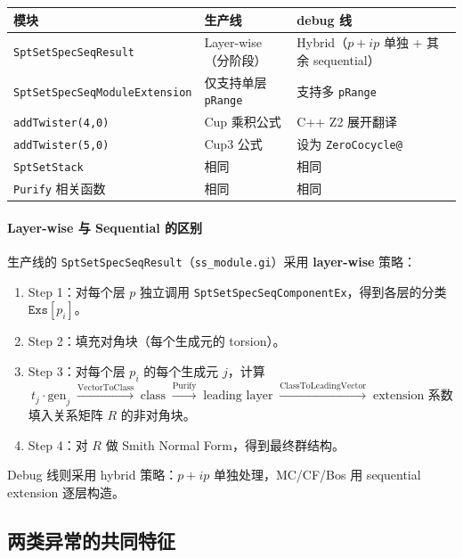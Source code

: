 \documentclass[a4paper,fontset=ubuntu,12pt]{ctexart}
\begin{document}
\begin{center}
\begin{tabular}{lll}
\hline
模块 & 生产线 & debug 线 \\
\hline
\texttt{SptSetSpecSeqResult} & Layer-wise（分阶段） & Hybrid（$p{+}ip$ 单独 + 其余 sequential） \\
\texttt{SptSetSpecSeqModuleExtension} & 仅支持单层 \texttt{pRange} & 支持多 \texttt{pRange} \\
\texttt{addTwister(4,0)} & Cup 乘积公式 & C++ Z2 展开翻译 \\
\texttt{addTwister(5,0)} & Cup3 公式 & 设为 \texttt{ZeroCocycle@} \\
\texttt{SptSetStack} & 相同 & 相同 \\
\texttt{Purify} 相关函数 & 相同 & 相同 \\
\hline
\end{tabular}
\end{center}

\paragraph{Layer-wise 与 Sequential 的区别}

生产线的 \texttt{SptSetSpecSeqResult}（\texttt{ss\_module.gi}）采用 \textbf{layer-wise} 策略：
\begin{enumerate}
\item Step 1：对每个层 $p$ 独立调用 \texttt{SptSetSpecSeqComponentEx}，得到各层的分类 $\texttt{Exs}[p_i]$。
\item Step 2：填充对角块（每个生成元的 torsion）。
\item Step 3：对每个层 $p_i$ 的每个生成元 $j$，计算
\begin{equation}
t_j \cdot \text{gen}_j \;\xrightarrow{\text{VectorToClass}}\; \text{class} \;\xrightarrow{\text{Purify}}\; \text{leading layer} \;\xrightarrow{\text{ClassToLeadingVector}}\; \text{extension 系数}
\end{equation}
填入关系矩阵 $R$ 的非对角块。
\item Step 4：对 $R$ 做 Smith Normal Form，得到最终群结构。
\end{enumerate}

Debug 线则采用 hybrid 策略：$p{+}ip$ 单独处理，MC/CF/Bos 用 sequential extension 逐层构造。

\subsection{两类异常的共同特征}
\end{document}
